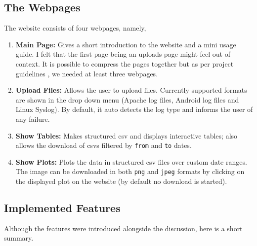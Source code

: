 \documentclass[11pt]{scrartcl}
\begin{document}
\subsection{The Webpages}

The website consists of four webpages, namely,

\begin{enumerate}
  \item \textbf{Main Page:} Gives a short introduction to the website and a mini
    usage guide. I felt that the first page being an uploads page might feel out
    of context. It is possible to compress the pages together but as per project
    guidelines \cite{logfileprob}, we needed at least three webpages.
  \item \textbf{Upload Files:} Allows the user to upload files. Currently
    supported formats are shown in the drop down menu (Apache log files,
    Android log files and Linux Syslog). By default, it auto
    detects the log type and informs the user of any failure.
  \item \textbf{Show Tables:} Makes structured csv and displays interactive
    tables; also allows the download of csvs filtered by \texttt{from} and
    \texttt{to} dates.
  \item \textbf{Show Plots:} Plots the data in structured csv
    files over custom date ranges. The image can be downloaded in both
    \texttt{png} and \texttt{jpeg} formats by clicking on the displayed plot on
    the website (by default no download is started).
\end{enumerate}

\subsection{Implemented Features}
\label{features}

Although the features were introduced alongside the discussion, here is a
short summary.
\end{document}
